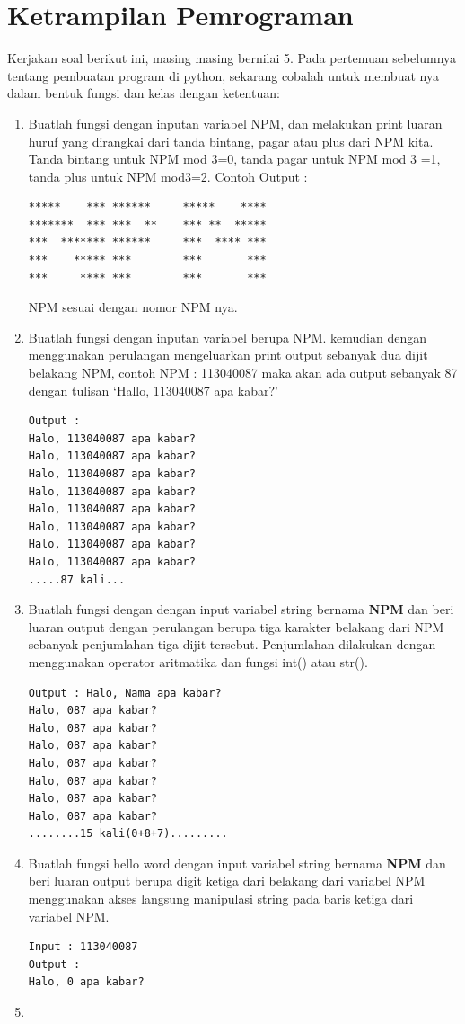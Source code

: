 \section{Ketrampilan Pemrograman}
Kerjakan soal berikut ini, masing masing bernilai 5. Pada pertemuan sebelumnya tentang pembuatan program di python, sekarang cobalah untuk membuat nya dalam bentuk fungsi dan kelas dengan ketentuan:
\begin{enumerate}
\item
Buatlah fungsi dengan inputan variabel NPM, dan melakukan print luaran huruf yang dirangkai dari tanda bintang, pagar atau plus dari NPM kita.
Tanda bintang untuk NPM mod 3=0, tanda pagar untuk NPM mod 3 =1, tanda plus untuk NPM mod3=2.
Contoh Output : 
\begin{verbatim}
*****    *** ******     *****    ****
*******  *** ***  **    *** **  *****
***  ******* ******     ***  **** ***
***    ***** ***        ***       ***
***     **** ***        ***       ***
\end{verbatim}
NPM sesuai dengan nomor NPM nya.
\item
Buatlah fungsi dengan inputan variabel berupa NPM. kemudian dengan menggunakan perulangan mengeluarkan print output sebanyak dua dijit belakang NPM, 
contoh NPM : 113040087 maka akan ada output sebanyak 87 dengan tulisan `Hallo, 113040087 apa kabar?'
\begin{verbatim}
Output : 
Halo, 113040087 apa kabar? 
Halo, 113040087 apa kabar?
Halo, 113040087 apa kabar?
Halo, 113040087 apa kabar?
Halo, 113040087 apa kabar?
Halo, 113040087 apa kabar?
Halo, 113040087 apa kabar?
Halo, 113040087 apa kabar?
.....87 kali...
\end{verbatim}
\item
Buatlah fungsi dengan dengan input variabel string bernama \textbf{NPM} dan beri luaran output dengan perulangan berupa tiga karakter belakang dari NPM sebanyak penjumlahan tiga dijit tersebut. Penjumlahan dilakukan dengan menggunakan operator aritmatika dan fungsi int() atau str().
\begin{verbatim}
Output : Halo, Nama apa kabar? 
Halo, 087 apa kabar?
Halo, 087 apa kabar?
Halo, 087 apa kabar?
Halo, 087 apa kabar?
Halo, 087 apa kabar?
Halo, 087 apa kabar?
Halo, 087 apa kabar?
........15 kali(0+8+7).........
\end{verbatim}
\item
Buatlah fungsi hello word dengan input variabel string bernama \textbf{NPM} dan beri luaran output berupa digit ketiga dari belakang dari variabel NPM menggunakan akses langsung manipulasi string pada baris ketiga dari variabel NPM.
\begin{verbatim}
Input : 113040087
Output :
Halo, 0 apa kabar?
\end{verbatim}
\item


\end{enumerate}
